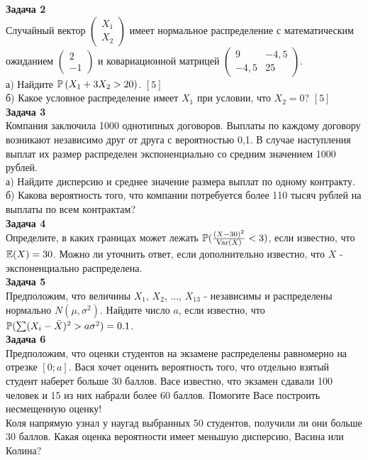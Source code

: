 \documentclass[12pt, a4paper]{article}\usepackage[]{graphicx}\usepackage[]{color}
\begin{document}
\textbf{Задача 2} \\ %
Случайный вектор  $\left(\begin{array}{c}
{X_{1} } \\ {X_{2} }
\end{array}\right)$  имеет нормальное распределение с
математическим ожиданием  $\left(\begin{array}{c} {2} \\ {-1}
\end{array}\right)$  и ковариационной матрицей
$\left(\begin{array}{cc} {9} & {-4,5} \\ {-4,5} & {25}
\end{array}\right)$. \\
а) Найдите  $\P\left(X_{1} +3X_{2} >20\right)$. $[5]$ \\
б) Какое условное распределение имеет $X_{1}$ при условии, что $X_{2}=0$? $[5]$ \\


\textbf{Задача 3} \\ %
Компания заключила 1000 однотипных договоров. Выплаты по каждому договору возникают независимо друг от друга с вероятностью 0,1. В случае наступления выплат их размер распределен экспоненциально со средним значением 1000 рублей. \\
а) Найдите дисперсию и среднее значение размера выплат по одному контракту. \\
б) Какова вероятность того, что компании потребуется более 110 тысяч рублей на выплаты по всем контрактам? \\

\textbf{Задача 4} \\ %
Определите, в каких границах может лежать $\P(\frac{(X-30)^{2}}{\Var(X)}<3)$, если известно, что $\E(X)=30$. Можно ли уточнить ответ, если дополнительно известно, что $X$ - экспоненциально распределена. \\

\textbf{Задача 5} \\ %
Предположим, что величины $X_{1}$, $X_{2}$, ..., $X_{13}$ - независимы и распределены нормально $N(\mu,\sigma^{2})$. Найдите число $a$, если известно, что $\P( \sum (X_{i}-\bar{X})^{2}>a\sigma^{2})=0.1$. \\

\textbf{Задача 6} \\
Предположим, что оценки студентов на экзамене распределены равномерно на отрезке $[0;a]$. Вася хочет оценить вероятность того, что отдельно взятый студент наберет больше 30 баллов. Васе известно, что экзамен сдавали 100 человек и 15 из них набрали более 60 баллов. Помогите Васе построить несмещенную оценку! \\
Коля напрямую узнал у наугад выбранных 50 студентов, получили ли они больше 30 баллов. Какая оценка вероятности имеет меньшую дисперсию, Васина или Колина? \\
\end{document}
